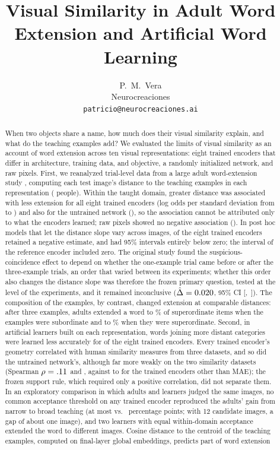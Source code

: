\documentclass[11pt]{article}
\title{Visual Similarity in Adult Word Extension and Artificial Word Learning}
\author{
P.~M.~Vera\\
Neurocreaciones\\
\texttt{patricio@neurocreaciones.ai}
}
\date{}
\begin{document}
\maketitle
\vspace{-1.0em}

\begin{abstract}
When two objects share a name, how much does their visual similarity explain, and what do the teaching examples add? We evaluated the limits of visual similarity as an account of word extension across ten visual representations: eight trained encoders that differ in architecture, training data, and objective, a randomly initialized network, and raw pixels. First, we reanalyzed trial-level data from a large adult word-extension study \parencite{lewis2018}, computing each test image's distance to the teaching examples in each representation (\VtPersons{} people). Within the taught domain, greater distance was associated with less extension for all eight trained encoders (log odds per standard deviation from \VtPcViTB{} to \VtPcMaeB) and also for the untrained network (\VtPcRandB), so the association cannot be attributed only to what the encoders learned; raw pixels showed no negative association (\VtPcPixB). In post hoc models that let the distance slope vary across images, \VcImgTrSameSignWord{} of the eight trained encoders retained a negative estimate, and \VcImgTrExclWord{} had 95\% intervals entirely below zero; the interval of the reference encoder included zero. The original study found the suspicious-coincidence effect to depend on whether the one-example trial came before or after the three-example trials, an order that varied between its experiments; whether this order also changes the distance slope was therefore the frozen primary question, tested at the level of the experiments, and it remained inconclusive ($\hat\Delta = 0.020$, 95\% CI [\VtOrdLo,~\VtOrdHi]). The composition of the examples, by contrast, changed extension at comparable distances: after three examples, adults extended a word to \SelSubSup\% of superordinate items when the examples were subordinate and to \SelSupSup\% when they were superordinate. Second, in artificial learners built on each representation, words joining more distant categories were learned less accurately for \VtDSupportWord{} of the eight trained encoders. Every trained encoder's geometry correlated with human similarity measures from three datasets, and so did the untrained network's, although far more weakly on the two similarity datasets (Spearman $\rho = .11$ and \VtHoneRandHsj, against \VcHoneTrMin{} to \VcHoneTrMax{} for the trained encoders other than MAE); the frozen support rule, which required only a positive correlation, did not separate them. In an exploratory comparison in which adults and learners judged the same images, no common acceptance threshold on any trained encoder reproduced the adults' gain from narrow to broad teaching (at most \VtXJumpMax{} vs.\ \VtXJumpAdult{} percentage points; with 12 candidate images, a gap of about one image), and two learners with equal within-domain acceptance extended the word to different images. Cosine distance to the centroid of the teaching examples, computed on final-layer global embeddings, predicts part of word extension 
\end{abstract}
\end{document}
